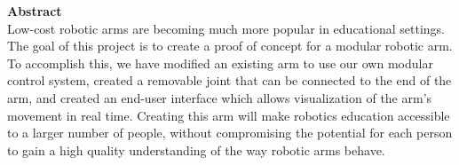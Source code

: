 \noindent \textbf{\Large Abstract} \\

\noindent Low-cost robotic arms are becoming much more popular in educational settings. The goal of this project is to create a proof of concept for a modular robotic arm. To accomplish this, we have modified an existing arm to use our own modular control system, created a removable joint that can be connected to the end of the arm, and created an end-user interface which allows visualization of the arm’s movement in real time. Creating this arm will make robotics education accessible to a larger number of people, without compromising the potential for each person to gain a high quality understanding of the way robotic arms behave. \\
\newpage
